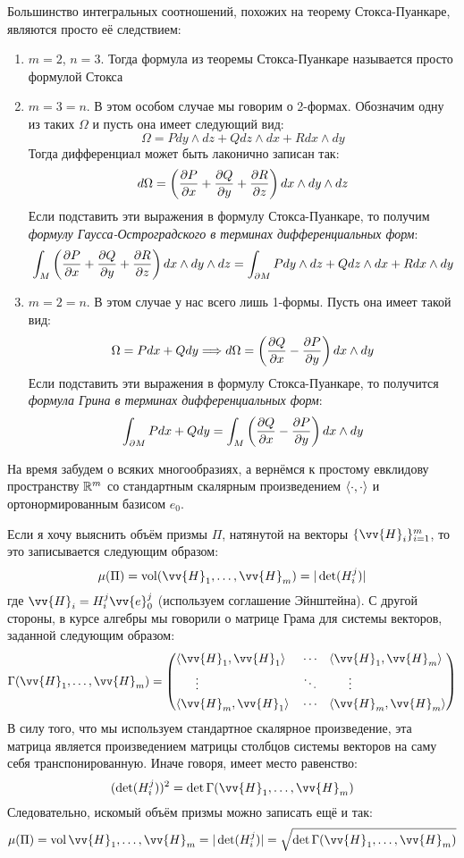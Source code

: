 \begin{corollary}
	Большинство интегральных соотношений, похожих на теорему Стокса-Пуанкаре, являются просто её следствием:
	\begin{enumerate}
		\item $m = 2$, $n = 3$. Тогда формула из теоремы Стокса-Пуанкаре называется просто формулой Стокса
		
		\item $m = 3 = n$. В этом особом случае мы говорим о 2-формах. Обозначим одну из таких $\Omega$ и пусть она имеет следующий вид:
		\[
			\Omega = P dy \wedge dz + Q dz \wedge dx + R dx \wedge dy
		\]
		Тогда дифференциал может быть лаконично записан так:
		\[
			d\Omega = \left(\frac{\partial P}{\partial x} + \frac{\partial Q}{\partial y} + \frac{\partial R}{\partial z}\right)dx \wedge dy \wedge dz
		\]
		Если подставить эти выражения в формулу Стокса-Пуанкаре, то получим \textit{формулу Гаусса-Остроградского в терминах дифференциальных форм}:
		\[
			\int_M \left(\frac{\partial P}{\partial x} + \frac{\partial Q}{\partial y} + \frac{\partial R}{\partial z}\right) dx \wedge dy \wedge dz = \int_{\partial M} P dy \wedge dz + Q dz \wedge dx + R dx \wedge dy
		\]
		
		\item $m = 2 = n$. В этом случае у нас всего лишь 1-формы. Пусть она имеет такой вид:
		\[
			\Omega = Pdx + Qdy \Longrightarrow d\Omega = \left(\frac{\partial Q}{\partial x} - \frac{\partial P}{\partial y}\right) dx \wedge dy
		\]
		Если подставить эти выражения в формулу Стокса-Пуанкаре, то получится \textit{формула Грина в терминах дифференциальных форм}:
		\[
			\int_{\partial M} Pdx + Qdy = \int_M \left(\frac{\partial Q}{\partial x} - \frac{\partial P}{\partial y}\right) dx \wedge dy
		\]
	\end{enumerate}
\end{corollary}

\begin{note}
	На время забудем о всяких многообразиях, а вернёмся к простому евклидову пространству $\mathbb{R}^m$ со стандартным скалярным произведением $\left\langle\cdot, \cdot\right\rangle$ и ортонормированным базисом $e_0$.
	
	Если я хочу выяснить объём призмы $\Pi$, натянутой на векторы $\{\vv{H}_i\}_{i = 1}^m$, то это записывается следующим образом:
	\[
		\mu(\Pi) = \vol(\vv{H}_1, \ldots, \vv{H}_m) = |\det(H_i^j)|
	\]
	где $\vv{H}_i = H_i^j \vv{e}_0^j$ (используем соглашение Эйнштейна). С другой стороны, в курсе алгебры мы говорили о матрице Грама для системы векторов, заданной следующим образом:
	\[
		\Gamma(\vv{H}_1, \ldots, \vv{H}_m) = \Matrix{
			&\ntbr{\vv{H}_1, \vv{H}_1}& &\cdots& &\ntbr{\vv{H}_1, \vv{H}_m}
			\\
			&\quad\;\ \vdots& &\ddots& &\quad\;\ \vdots
			\\
			&\ntbr{\vv{H}_m, \vv{H}_1}& &\cdots& &\ntbr{\vv{H}_m, \vv{H}_m}
		}
	\]
	В силу того, что мы используем стандартное скалярное произведение, эта матрица является произведением матрицы столбцов системы векторов на саму себя транспонированную. Иначе говоря, имеет место равенство:
	\[
		(\det(H_i^j))^2 = \det\Gamma(\vv{H}_1, \ldots, \vv{H}_m)
	\]
	Следовательно, искомый объём призмы можно записать ещё и так:
	\[
		\mu(\Pi) = \vol{\vv{H}_1, \ldots, \vv{H}_m} = |\det(H_i^j)| = \sqrt{\det\Gamma(\vv{H}_1, \ldots, \vv{H}_m)}
	\]
\end{note}

